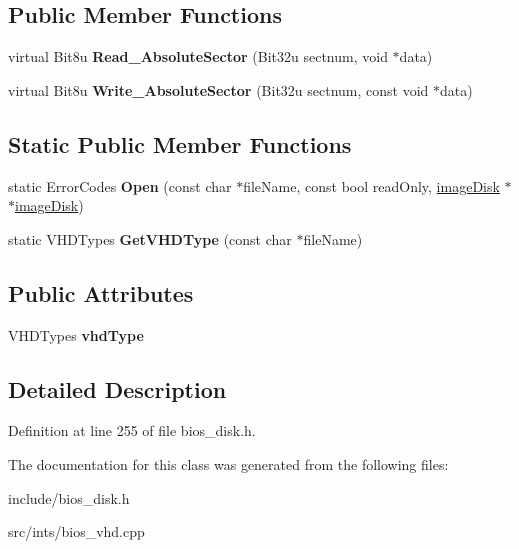 \subsection*{Public Member Functions}
\begin{DoxyCompactItemize}
\item 
\hypertarget{classimageDiskVHD_a928117145e7f5abd8ff0f151d3d27186}{virtual Bit8u {\bfseries Read\-\_\-\-Absolute\-Sector} (Bit32u sectnum, void $\ast$data)}\label{classimageDiskVHD_a928117145e7f5abd8ff0f151d3d27186}

\item 
\hypertarget{classimageDiskVHD_a86534727d81baae796b45b6a795b73df}{virtual Bit8u {\bfseries Write\-\_\-\-Absolute\-Sector} (Bit32u sectnum, const void $\ast$data)}\label{classimageDiskVHD_a86534727d81baae796b45b6a795b73df}

\end{DoxyCompactItemize}
\subsection*{Static Public Member Functions}
\begin{DoxyCompactItemize}
\item 
\hypertarget{classimageDiskVHD_a8c85843d48694462046b6b9a02c8f4f9}{static Error\-Codes {\bfseries Open} (const char $\ast$file\-Name, const bool read\-Only, \hyperlink{classimageDisk}{image\-Disk} $\ast$$\ast$\hyperlink{classimageDisk}{image\-Disk})}\label{classimageDiskVHD_a8c85843d48694462046b6b9a02c8f4f9}

\item 
\hypertarget{classimageDiskVHD_ac493a1534615d6aa2c3a0cda6dbc9a31}{static V\-H\-D\-Types {\bfseries Get\-V\-H\-D\-Type} (const char $\ast$file\-Name)}\label{classimageDiskVHD_ac493a1534615d6aa2c3a0cda6dbc9a31}

\end{DoxyCompactItemize}
\subsection*{Public Attributes}
\begin{DoxyCompactItemize}
\item 
\hypertarget{classimageDiskVHD_a39c97d47ff1d52756d8cf86fc53e352d}{V\-H\-D\-Types {\bfseries vhd\-Type}}\label{classimageDiskVHD_a39c97d47ff1d52756d8cf86fc53e352d}

\end{DoxyCompactItemize}


\subsection{Detailed Description}


Definition at line 255 of file bios\-\_\-disk.\-h.



The documentation for this class was generated from the following files\-:\begin{DoxyCompactItemize}
\item 
include/bios\-\_\-disk.\-h\item 
src/ints/bios\-\_\-vhd.\-cpp\end{DoxyCompactItemize}
